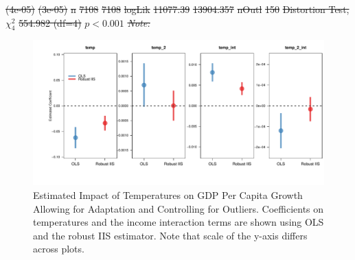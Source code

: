 \documentclass[11pt, letterpaper]{article}
\numberwithin{algorithm}{section}
\numberwithin{assumption}{section}
\numberwithin{lemma}{section}
\numberwithin{theorem}{section}
\numberwithin{corollary}{section}
\numberwithin{remark}{section}
\numberwithin{equation}{section}
\numberwithin{figure}{section}
\numberwithin{table}{section}
\providecommand{\DIFdel}[1]{{\protect\color{red}\sout{#1}}}                      %
\providecommand{\DIFaddbegin}{} %
\providecommand{\DIFaddend}{} %
\providecommand{\DIFdelbegin}{} %
\providecommand{\DIFdelend}{} %
\providecommand{\DIFdelFL}[1]{\DIFdel{#1}} %
\providecommand{\DIFaddbeginFL}{} %
\providecommand{\DIFaddendFL}{} %
\providecommand{\DIFdelbeginFL}{} %
\providecommand{\DIFdelendFL}{} %
\newcommand{\DIFscaledelfig}{0.5}
\newlength{\DIFdelgraphicswidth} %
\newlength{\DIFdelgraphicsheight} %
\newcommand{\DIFaddincludegraphics}[2][]{{\color{blue}\fbox{\DIFOincludegraphics[#1]{#2}}}} %
\newcommand{\DIFdelincludegraphics}[2][]{%
\sbox{\DIFdelgraphicsbox}{\DIFOincludegraphics[#1]{#2}}%
\settoboxwidth{\DIFdelgraphicswidth}{\DIFdelgraphicsbox} %
\settoboxtotalheight{\DIFdelgraphicsheight}{\DIFdelgraphicsbox} %
\scalebox{\DIFscaledelfig}{%
\parbox[b]{\DIFdelgraphicswidth}{\usebox{\DIFdelgraphicsbox}\\[-\baselineskip] \rule{\DIFdelgraphicswidth}{0em}}\llap{\resizebox{\DIFdelgraphicswidth}{\DIFdelgraphicsheight}{%
\setlength{\unitlength}{\DIFdelgraphicswidth}%
\begin{picture}(1,1)%
\thicklines\linethickness{2pt} %
{\color[rgb]{1,0,0}\put(0,0){\framebox(1,1){}}}%
{\color[rgb]{1,0,0}\put(0,0){\line( 1,1){1}}}%
{\color[rgb]{1,0,0}\put(0,1){\line(1,-1){1}}}%
\end{picture}%
}\hspace*{3pt}}} %
} %
\DeclareRobustCommand{\DIFaddbegin}{\DIFOaddbegin \let\includegraphics\DIFaddincludegraphics} %
\DeclareRobustCommand{\DIFaddend}{\DIFOaddend \let\includegraphics\DIFOincludegraphics} %
\DeclareRobustCommand{\DIFdelbegin}{\DIFOdelbegin \let\includegraphics\DIFdelincludegraphics} %
\DeclareRobustCommand{\DIFdelend}{\DIFOaddend \let\includegraphics\DIFOincludegraphics} %
\DeclareRobustCommand{\DIFaddbeginFL}{\DIFOaddbeginFL \let\includegraphics\DIFaddincludegraphics} %
\DeclareRobustCommand{\DIFaddendFL}{\DIFOaddendFL \let\includegraphics\DIFOincludegraphics} %
\DeclareRobustCommand{\DIFdelbeginFL}{\DIFOdelbeginFL \let\includegraphics\DIFdelincludegraphics} %
\DeclareRobustCommand{\DIFdelendFL}{\DIFOaddendFL \let\includegraphics\DIFOincludegraphics} %
\begin{document}
\DIFdelFL{(4e-05) }%
\DIFdelFL{(3e-05) }%
\DIFdelFL{n }%
\DIFdelFL{7108 }%
\DIFdelFL{7108 }%
\DIFdelFL{logLik }%
\DIFdelFL{11077.39 }%
\DIFdelFL{13904.357 }%
\DIFdelFL{nOutl }%
\DIFdelFL{150 }%
\DIFdelFL{Distortion Test, $\chi^2_{4}$ }%
\DIFdelFL{554.982 (df=4)}%
\DIFdelFL{$p<0.001$}%
\textit{\DIFdelFL{Note:}}  %
\DIFdelend \DIFaddbegin 
\DIFaddend

\DIFdelbegin %

\DIFdelend \begin{figure}[!htbp]  \DIFdelbeginFL %
\DIFdelendFL %
\centering
\DIFdelbeginFL %
\DIFdelendFL %
\DIFaddbeginFL \includegraphics[width = \textwidth]{coef.adapt.pdf}
\DIFaddendFL \caption{Estimated Impact of Temperatures on GDP Per Capita Growth Allowing for Adaptation and Controlling for Outliers. Coefficients on temperatures and the income interaction terms are shown using OLS and the robust IIS estimator. Note that scale of the y-axis differs across plots.}
\label{fig_dist_coef_app1}
\end{figure}
\end{document}
